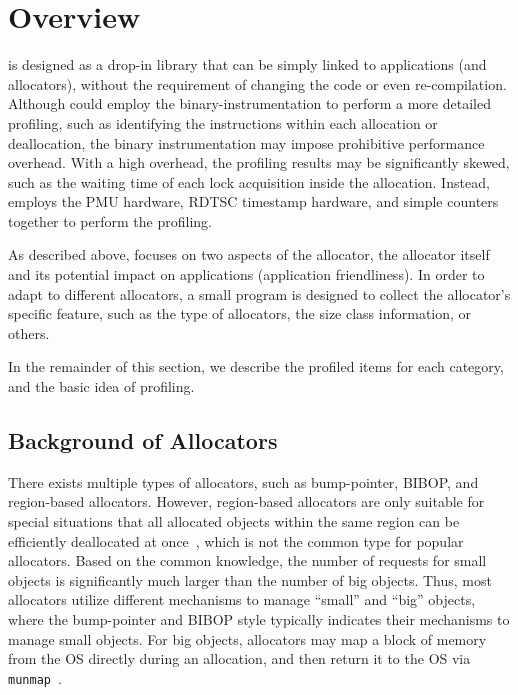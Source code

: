 \section{Overview}

\MP{} is designed as a drop-in library that can be simply linked to applications (and allocators), without the requirement of changing the code or even re-compilation. Although \MP{} could employ the binary-instrumentation to perform a more detailed profiling, such as identifying the instructions within each allocation or deallocation, the binary instrumentation may impose prohibitive performance overhead. With a high overhead, the profiling results may be significantly skewed, such as the waiting time of each lock acquisition inside the allocation. Instead, \MP{} employs the PMU hardware, RDTSC timestamp hardware, and simple counters together to perform the profiling.  
 
As described above, \MP{} focuses on two aspects of the allocator, the allocator itself and its potential impact on applications (application friendliness). In order to adapt to different allocators, a small program is designed to collect the allocator's specific feature, such as the type of allocators, the size class information, or others. 

In the remainder of this section, we describe the profiled items for each category, and the basic idea of profiling. 

\subsection{Background of Allocators}

\label{sec:allocator}

There exists multiple types of allocators, such as bump-pointer, BIBOP, and region-based allocators. However, region-based allocators are only suitable for special situations that all allocated objects within the same region can be efficiently deallocated at once~\cite{Gay:1998:MME:277650.277748}, which is not the common type for popular allocators. Based on the common knowledge,  the number of requests for small objects is significantly much larger than the number of big objects. Thus, most allocators utilize different mechanisms to manage ``small'' and ``big'' objects, where the bump-pointer and BIBOP style typically indicates their mechanisms to manage small objects. For big objects, allocators may map a block of memory from the OS directly during an allocation, and then return it to the OS via \texttt{munmap}~\cite{Hoard}.   

